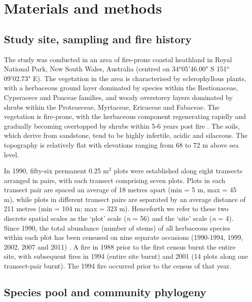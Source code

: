 \section{Materials and methods}

\subsection{Study site, sampling and fire history}

The study was conducted in an area of fire-prone coastal heathland in Royal National Park, New South Wales, Australia (centred on 34$^{o}$05'46.00" S 151$^{o}$09'02.73" E). The vegetation in the area is characterised by sclerophyllous plants, with a herbaceous ground layer dominated by species within the Restionaceae, Cyperacece and Poaceae families, and woody overstorey layers dominated by shrubs within the Proteaeceae, Myrtaceae, Ericaceae and Fabaceae.  The vegetation is fire-prone, with the herbaceous component regenerating rapidly and gradually becoming overtopped by shrubs within 5-6 years post fire \citep{KEITH2007}. The soils, which derive from sandstone, tend to be highly infertile, acidic and silaceous. The topography is relatively flat with elevations ranging from 68 to 72 m above sea level.

In 1990, fifty-six permanent 0.25 m$^{2}$ plots were established along eight transects arranged in pairs, with each transect comprising seven plots. Plots in each transect pair are spaced an average of 18 metres apart (min = 5 m, max = 45 m), while plots in different transect pairs are separated by an average distance of 211 metres (min = 104 m; max = 323 m). Henceforth we refer to these two discrete spatial scales as the `plot' scale (\textit{n} = 56) and the `site' scale (\textit{n} = 4). Since 1990, the total abundance (number of stems) of all herbaceous species within each plot has been censused on nine separate occasions (1990-1994, 1999, 2002, 2007 and 2011) \citep{Keith2012}.  A fire in 1988 prior to the first census burnt the entire site, with subsequent fires in 1994 (entire site burnt) and 2001 (14 plots along one transect-pair burnt). The 1994 fire occurred prior to the census of that year. 

\subsection{Species pool and community phylogeny}

